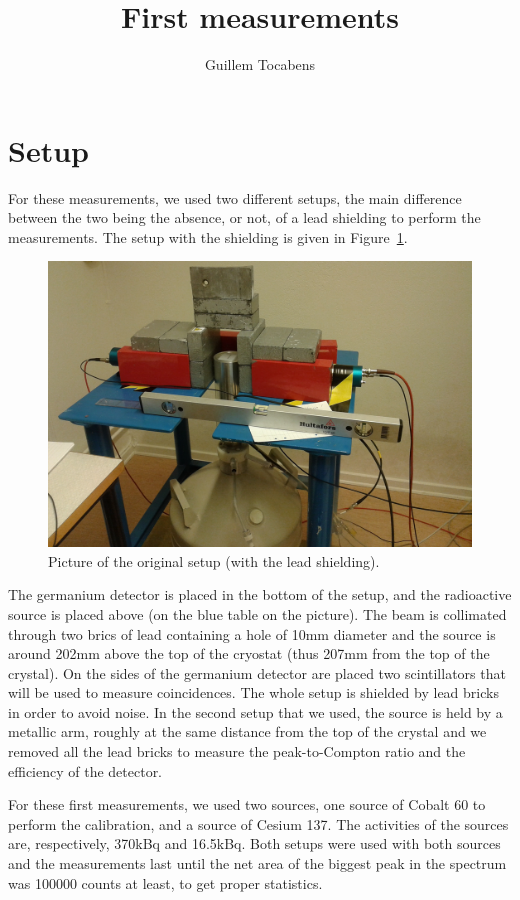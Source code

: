 \documentclass[11pt,a4paper]{article}
\author{Guillem Tocabens}
\title{First measurements}
\begin{document}
\section{Setup}

For these measurements, we used two different setups, the main difference between the two being the absence, or not, of a lead shielding to perform the measurements. The setup with the shielding is given in Figure~\ref{Setup}.

\begin{figure}[!h]
\centering
\includegraphics[scale=0.2]{Setup.jpg}
\caption{Picture of the original setup (with the lead shielding).}
\label{Setup}
\end{figure}

The germanium detector is placed in the bottom of the setup, and the radioactive source is placed above (on the blue table on the picture). The beam is collimated through two brics of lead containing a hole of 10mm diameter and the source is around 202mm above the top of the cryostat (thus 207mm from the top of the crystal). On the sides of the germanium detector are placed two scintillators that will be used to measure coincidences. The whole setup is shielded by lead bricks in order to avoid noise. In the second setup that we used, the source is held by a metallic arm, roughly at the same distance from the top of the crystal and we removed all the lead bricks to measure the peak-to-Compton ratio and the efficiency of the detector.

For these first measurements, we used two sources, one source of Cobalt 60 to perform the calibration, and a source of Cesium 137. The activities of the sources are, respectively, 370kBq and 16.5kBq. %
Both setups were used with both sources and the measurements last until the net area of the biggest peak in the spectrum was 100000 counts at least, to get proper statistics.
\end{document}
